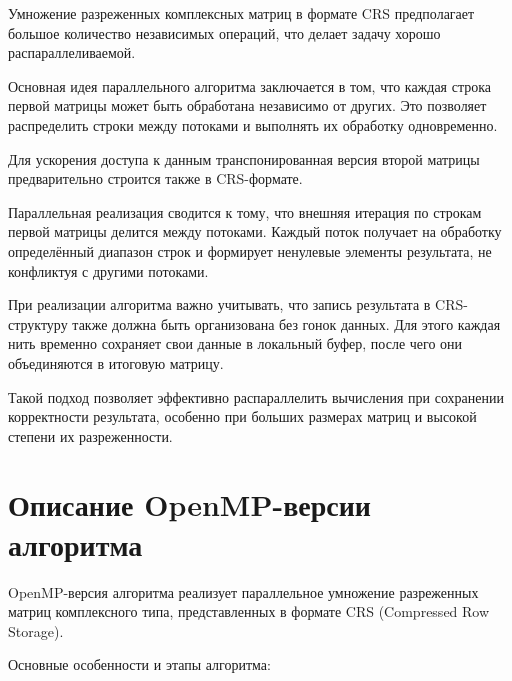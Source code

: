 \documentclass[a4paper,12pt]{article}
\begin{document}
Умножение разреженных комплексных матриц в формате CRS предполагает большое количество независимых операций, что делает задачу хорошо распараллеливаемой.

Основная идея параллельного алгоритма заключается в том, что каждая строка первой матрицы может быть обработана независимо от других. Это позволяет распределить строки между потоками и выполнять их обработку одновременно.

Для ускорения доступа к данным транспонированная версия второй матрицы предварительно строится также в CRS-формате.

Параллельная реализация сводится к тому, что внешняя итерация по строкам первой матрицы делится между потоками. Каждый поток получает на обработку определённый диапазон строк и формирует ненулевые элементы результата, не конфликтуя с другими потоками.

При реализации алгоритма важно учитывать, что запись результата в CRS-структуру также должна быть организована без гонок данных. Для этого каждая нить временно сохраняет свои данные в локальный буфер, после чего они объединяются в итоговую матрицу.

Такой подход позволяет эффективно распараллелить вычисления при сохранении корректности результата, особенно при больших размерах матриц и высокой степени их разреженности.

\newpage

\section{Описание OpenMP-версии алгоритма}

OpenMP-версия алгоритма реализует параллельное умножение разреженных матриц комплексного типа, представленных в формате CRS (Compressed Row Storage).

Основные особенности и этапы алгоритма:
\end{document}
